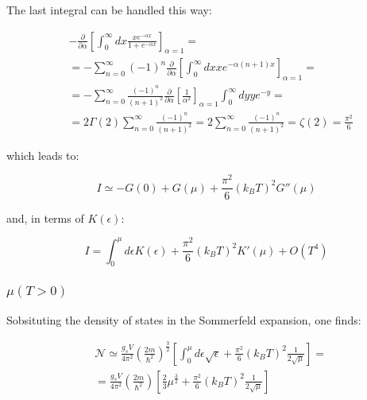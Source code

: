 \documentclass{article}
\begin{document}
The last integral can be handled this way:

\begin{equation}
    \begin{aligned}
         & -\frac{\partial}{\partial \alpha}\left[\int_0^\infty dx \frac{xe^{-\alpha x}}{1+e^{-\alpha x}}\right]_{\alpha=1}=                               \\
         & =-\sum_{n=0}^ \infty (-1)^n\frac{\partial}{\partial \alpha}\left[ \int_0^\infty dx x e^{-\alpha(n+1)x} \right]_{\alpha=1}=                      \\
         & =-\sum_{n=0}^\infty \frac{(-1)^n}{(n+1)^2}\frac{\partial}{\partial \alpha}\left[\frac{1}{\alpha^2} \right]_{\alpha=1}\int_0^\infty dy y e^{-y}= \\
         & = 2\Gamma(2)\sum_{n=0}^\infty \frac{(-1)^n}{(n+1)^2}=2\sum_{n=0}^\infty \frac{(-1)^n}{(n+1)^2}=\zeta(2)=\frac{\pi^2}{6}
    \end{aligned}
\end{equation}

which leads to:

\begin{equation}
    I\simeq -G(0)+G(\mu)+\frac{\pi^2}{6}(k_BT)^2G''(\mu)
\end{equation}

and, in terms of $K(\epsilon)$:

\begin{equation}
    I=\int_0^\mu d\epsilon K(\epsilon)+\frac{\pi^2}{6}(k_BT)^2K'(\mu)+O(T^4)
\end{equation}

\subsubsection{$\mu(T>0)$}

Sobsituting the density of states in the Sommerfeld expansion, one finds:

\begin{equation}
    \begin{aligned}
         & \mathcal{N}\simeq \frac{g_sV}{4\pi^2}\left(\frac{2m}{\hbar^2}\right)^{\frac{3}{2}}\left[\int_0^\mu d\epsilon \sqrt{\epsilon}+\frac{\pi^2}{6}(k_BT)^2\frac{1}{2\sqrt{\mu}}\right]= \\
         & =\frac{g_s V}{4\pi^2}\left(\frac{2m}{\hbar^2}\right)\left[\frac{2}{3}\mu^{\frac{3}{2}}+\frac{\pi^2}{6}(k_BT)^2\frac{1}{2\sqrt{\mu}}\right]
    \end{aligned}
\end{equation}
\end{document}
